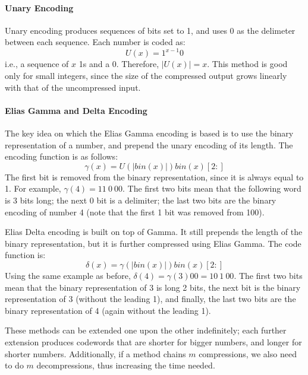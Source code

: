 \paragraph{Unary Encoding}
Unary encoding produces sequences of bits set to 1, and uses 0 as the delimeter between each sequence. Each number is coded as:
\begin{equation*}
    U(x) = 1^{x-1}0
\end{equation*}
i.e., a sequence of $x$ 1s and a 0. Therefore, $|U(x)| = x$. This method is good only for small integers, since the size of the compressed output grows linearly with that of the uncompressed input.

\paragraph{Elias Gamma and Delta Encoding}
The key idea on which the Elias Gamma encoding is based is to use the binary representation of a number, and prepend the unary encoding of its length. The encoding function is as follows:
\begin{equation*}
    \gamma(x) = U(|\textit{bin}(x)|) \textit{bin}(x)[2:]
\end{equation*}
The first bit is removed from the binary representation, since it is always equal to 1. For example, $\gamma(4) = 11 \ 0 \ 00$. The first two bits mean that the following word is 3 bits long; the next 0 bit is a delimiter; the last two bits are the binary encoding of number 4 (note that the first 1 bit was removed from 100).

Elias Delta encoding is built on top of Gamma. It still prepends the length of the binary representation, but it is further compressed using Elias Gamma. The code function is:
\begin{equation*}
    \delta(x) = \gamma(|\textit{bin}(x)|) \textit{bin}(x)[2:]
\end{equation*}
Using the same example as before, $\delta(4) = \gamma(3) 00 = 10 \ 1 \ 00$. The first two bits mean that the binary representation of 3 is long 2 bits, the next bit is the binary representation of 3 (without the leading 1), and finally, the last two bits are the binary representation of 4 (again without the leading 1).

These methods can be extended one upon the other indefinitely; each further extension produces codewords that are shorter for bigger numbers, and longer for shorter numbers. Additionally, if a method chains $m$ compressions, we also need to do $m$ decompressions, thus increasing the time needed.

